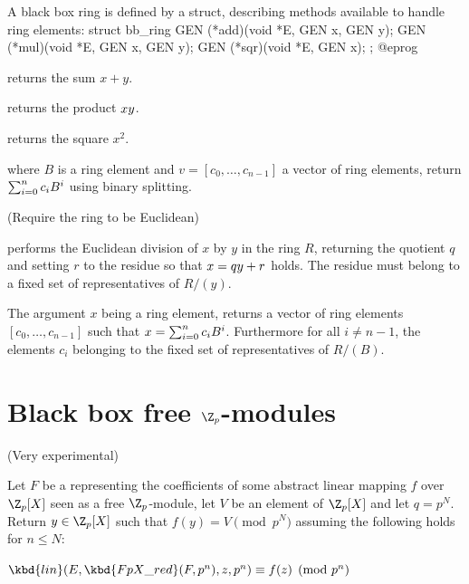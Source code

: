 A black box ring is defined by a  struct, describing methods
available to handle ring elements:
\bprog
struct bb_ring
{
  GEN (*add)(void *E, GEN x, GEN y);
  GEN (*mul)(void *E, GEN x, GEN y);
  GEN (*sqr)(void *E, GEN x);
};
@eprog

 returns the sum $x+y$.

 returns the product $x\*y$.

 returns the square $x^2$.

where $B$ is a ring element and $v=[c_0,\ldots,c_{n-1}]$ a vector of ring elements,
return $\sum_{i=0}^n c_i\*B^i$ using binary splitting.


(Require the ring to be Euclidean)

 performs the Euclidean division of $x$ by $y$ in the ring
$R$, returning the quotient $q$ and setting $r$ to the residue so that
$x=q\*y+r$ holds. The residue must belong to a fixed set of representatives of
$R/(y)$.

The argument $x$ being a ring element,  returns a vector of
ring elements $[c_0,\ldots,c_{n-1}]$ such that $x = \sum_{i=0}^n c_i\*B^i$.
Furthermore for all $i\ne n-1$, the elements $c_i$ belonging to the fixed set
of representatives of $R/(B)$.

\section{Black box free $\Z_p$-modules}

(Very experimental)


Let $F$ be a  representing the coefficients of some abstract
linear mapping $f$ over $\Z_p[X]$ seen as a free $\Z_p$-module, let $V$ be
an element of $\Z_p[X]$ and let $q = p^N$.  Return $y\in\Z_p[X]$ such that
$f(y)=V\pmod{p^N}$ assuming the following holds for $n\leq N$:

\item $\kbd{lin}(E, \kbd{FpX\_red}(F, p^n), z, p^n) \equiv f(z) \pmod{p^n}$

